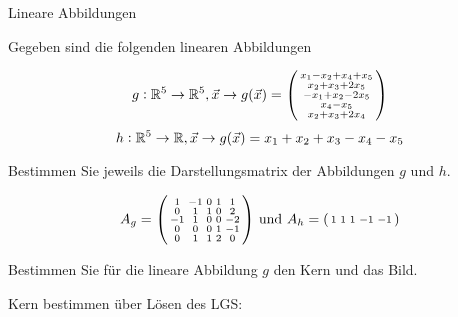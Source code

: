 \begin{example2}[breakable]{Lineare Abbildungen}

    Gegeben sind die folgenden linearen Abbildungen

    $$
    g: \mathbb{R}^5 \rightarrow \mathbb{R}^5, \vec{x} \rightarrow g(\vec{x})=\begin{psmallmatrix}
        x_1 - x_2 + x_4 + x_5 \\
        x_2 + x_3 + 2x_5 \\
        -x_1 + x_2 - 2x_5 \\
        x_4 - x_5 \\
        x_2 + x_3 + 2x_4
    \end{psmallmatrix}
    $$
    $$
    h: \mathbb{R}^5 \rightarrow \mathbb{R}, \vec{x} \rightarrow g(\vec{x})=x_1 + x_2 + x_3 - x_4 - x_5
    $$

Bestimmen Sie jeweils die Darstellungsmatrix der Abbildungen $g$ und $h$.

$$
A_g = \begin{psmallmatrix}
    1 & -1 & 0 & 1 & 1 \\
    0 & 1 & 1 & 0 & 2 \\
    -1 & 1 & 0 & 0 & -2 \\
    0 & 0 & 0 & 1 & -1 \\
    0 & 1 & 1 & 2 & 0
\end{psmallmatrix}
\text{ und }
A_h = \begin{psmallmatrix}
    1 & 1 & 1 & -1 & -1
\end{psmallmatrix}
$$

Bestimmen Sie für die lineare Abbildung $g$ den Kern und das Bild.

Kern bestimmen über Lösen des LGS:


\end{example2}
